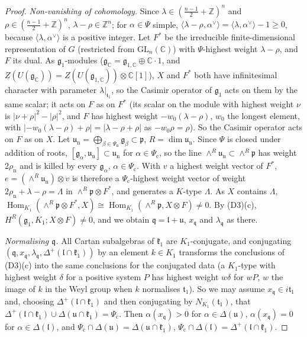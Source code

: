 \documentclass[10pt]{amsart}
\theoremstyle{definition}
\theoremstyle{remark}
\newcommand{\C}{\mathbb C}
\newcommand{\Z}{\mathbb Z}
\begin{document}
\begin{proof}
\emph{Non-vanishing of cohomology.} Since $\lambda\in(\frac{n-1}2+\Z)^n$ and $\rho\in(\frac{n-1}2+\Z)^n$, $\lambda-\rho\in\Z^n$; for $\alpha\in\Psi$ simple, $\langle\lambda-\rho,\alpha^\vee\rangle=\langle\lambda,\alpha^\vee\rangle-1\ge0$, because $\langle\lambda,\alpha^\vee\rangle$ is a positive integer. Let $F^*$ be the irreducible finite-dimensional representation of $G$ (restricted from $\mathrm{GL}_n(\C)$) with $\Psi$-highest weight $\lambda-\rho$, and $F$ its dual. As $\mathfrak g_1$-modules ($\mathfrak g_\C=\mathfrak g_{1,\C}\oplus\C\cdot1$, and $Z(U(\mathfrak g_\C))=Z(U(\mathfrak g_{1,\C}))\otimes\C[1]$), $X$ and $F^*$ both have infinitesimal character with parameter $\lambda|_{\mathfrak t_1}$, so the Casimir operator of $\mathfrak g_1$ acts on them by the same scalar; it acts on $F$ as on $F^*$ (its scalar on the module with highest weight $\nu$ is $|\nu+\rho|^2-|\rho|^2$, and $F$ has highest weight $-w_0(\lambda-\rho)$, $w_0$ the longest element, with $|-w_0(\lambda-\rho)+\rho|=|\lambda-\rho+\rho|$ as $-w_0\rho=\rho$). So the Casimir operator acts on $F$ as on $X$. Let $\mathfrak u_{\mathrm n}=\bigoplus_{\beta\in\Psi_{\mathrm n}}\mathfrak g_\beta\subset\mathfrak p$, $R=\dim\mathfrak u_{\mathrm n}$. Since $\Psi$ is closed under addition of roots, $[\mathfrak g_\alpha,\mathfrak u_{\mathrm n}]\subset\mathfrak u_{\mathrm n}$ for $\alpha\in\Psi_{\mathrm c}$, so the line $\wedge^R\mathfrak u_{\mathrm n}\subset\wedge^R\mathfrak p$ has weight $2\rho_{\mathrm n}$ and is killed by every $\mathfrak g_\alpha$, $\alpha\in\Psi_{\mathrm c}$. With $v$ a highest weight vector of $F^*$, $e=(\wedge^R\mathfrak u_{\mathrm n})\otimes v$ is therefore a $\Psi_{\mathrm c}$-highest weight vector of weight $2\rho_{\mathrm n}+\lambda-\rho=\Lambda$ in $\wedge^R\mathfrak p\otimes F^*$, and generates a $K$-type $\Lambda$. As $X$ contains $\Lambda$, $\operatorname{Hom}_{K_1}(\wedge^R\mathfrak p\otimes F^*,X)\cong\operatorname{Hom}_{K_1}(\wedge^R\mathfrak p,X\otimes F)\ne0$. By (D3)(c), $H^R(\mathfrak g_1,K_1;X\otimes F)\ne0$, and we obtain $\mathfrak q=\mathfrak l+\mathfrak u$, $x_{\mathfrak q}$ and $\lambda_{\mathfrak q}$ as there.

\emph{Normalising $\mathfrak q$.} All Cartan subalgebras of $\mathfrak k_1$ are $K_1$-conjugate, and conjugating $(\mathfrak q,x_{\mathfrak q},\lambda_{\mathfrak q},\Delta^+(\mathfrak l\cap\mathfrak k_1))$ by an element $k\in K_1$ transforms the conclusions of (D3)(c) into the same conclusions for the conjugated data (a $K_1$-type with highest weight $\delta$ for a positive system $P$ has highest weight $w\delta$ for $wP$, $w$ the image of $k$ in the Weyl group when $k$ normalises $\mathfrak t_1$). So we may assume $x_{\mathfrak q}\in i\mathfrak t_1$ and, choosing $\Delta^+(\mathfrak l\cap\mathfrak k_1)$ and then conjugating by $N_{K_1}(\mathfrak t_1)$, that $\Delta^+(\mathfrak l\cap\mathfrak k_1)\cup\Delta(\mathfrak u\cap\mathfrak k_1)=\Psi_{\mathrm c}$. Then $\alpha(x_{\mathfrak q})>0$ for $\alpha\in\Delta(\mathfrak u)$, $\alpha(x_{\mathfrak q})=0$ for $\alpha\in\Delta(\mathfrak l)$, and $\Psi_{\mathrm c}\cap\Delta(\mathfrak u)=\Delta(\mathfrak u\cap\mathfrak k_1)$, $\Psi_{\mathrm c}\cap\Delta(\mathfrak l)=\Delta^+(\mathfrak l\cap\mathfrak k_1)$.


\end{proof}
\end{document}
